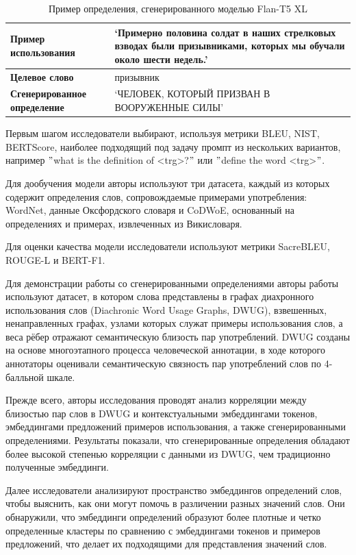 \documentclass[LI,VKR]{HSEUniversity}
\begin{document}
\begin{table}[htbp]
\centering
\caption{Пример определения, сгенерированного моделью Flan-T5 XL}
\begin{tabular}{|l|p{10cm}|}
\hline
\textbf{Пример использования} & ‘Примерно половина солдат в наших стрелковых взводах были призывниками, которых мы обучали около шести недель.’ \\
\hline
\textbf{Целевое слово} & призывник \\
\hline
\textbf{Сгенерированное определение} & ‘ЧЕЛОВЕК, КОТОРЫЙ ПРИЗВАН В ВООРУЖЕННЫЕ СИЛЫ’ \\
\hline
\end{tabular}
\end{table}

Первым шагом исследователи выбирают, используя метрики BLEU, NIST, BERTScore, наиболее
подходящий под задачу промпт из нескольких вариантов, например
\("\)what is the definition of <trg>?\("\) или \("\)define the word <trg>\("\).

Для дообучения модели авторы используют три датасета, каждый из которых содержит определения
слов, сопровождаемые примерами употребления: WordNet, данные Оксфордского словаря и CoDWoE,
основанный на определениях и примерах, извлеченных из Викисловаря.

Для оценки качества модели исследователи используют метрики SacreBLEU, ROUGE-L и BERT-F1.

Для демонстрации работы со сгенерированными определениями авторы
работы используют датасет, в котором слова представлены в графах диахронного использования
слов (Diachronic Word Usage Graphs, DWUG), взвешенных, ненаправленных графах,
узлами которых служат примеры использования слов, а веса рёбер отражают семантическую
близость пар употреблений.
DWUG созданы на основе многоэтапного процесса человеческой аннотации, в ходе которого аннотаторы
оценивали семантическую связность пар употреблений слов по 4-балльной шкале.

Прежде всего, авторы исследования проводят анализ корреляции между близостью пар слов в DWUG
и контекстуальными эмбеддингами токенов, эмбеддингами предложений примеров использования, а также
сгенерированными определениями.
Результаты показали, что сгенерированные определения обладают более высокой степенью
корреляции с данными из DWUG, чем традиционно полученные эмбеддинги.

Далее исследователи анализируют пространство эмбеддингов определений слов,
чтобы выяснить, как они могут помочь в различении разных значений слов.
Они обнаружили, что эмбеддинги определений образуют более плотные и четко определенные
кластеры по сравнению с эмбеддингами токенов и примеров предложений, что делает их
подходящими для представления значений слов.
\end{document}

